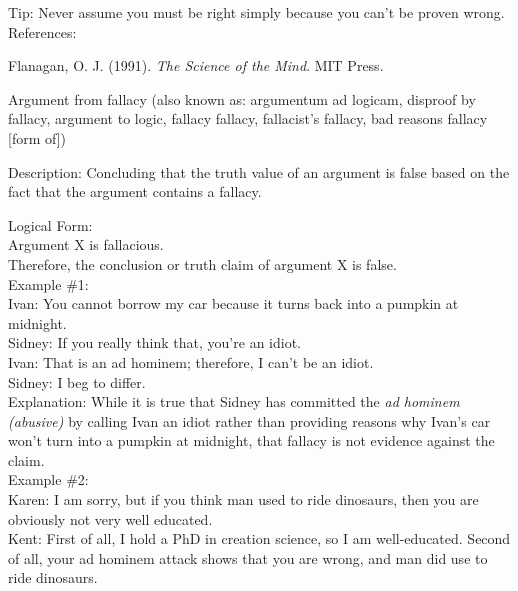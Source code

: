 \documentclass[a4paper,12pt,single,pdftex]{scrbook}
\begin{document}
      
        Tip: Never assume you must be right simply because you can’t be proven wrong.
      \\

      References:

      
        Flanagan, O. J. (1991). {\it The Science of the Mind}. MIT Press.
      
    
  

Argument from fallacy
    (also known as: argumentum ad logicam, disproof by fallacy, argument to logic, fallacy fallacy, fallacist's fallacy, bad reasons fallacy [form of])
  
    Description: Concluding that the truth value of an argument is false based on the fact that the argument contains a fallacy.

    
      Logical Form:
    \\

    
      Argument X is fallacious.
    \\

    
      Therefore, the conclusion or truth claim of argument X is false.
    \\

    
      Example \#1:
    \\

    
      Ivan: You cannot borrow my car because it turns back into a pumpkin at midnight.
    \\

    
      Sidney: If you really think that, you’re an idiot.
    \\

    
      Ivan: That is an ad hominem; therefore, I can’t be an idiot.
    \\

    
      Sidney: I beg to differ.
    \\

    
      Explanation: While it is true that Sidney has committed the {\it ad hominem (abusive)} by calling Ivan an idiot rather than providing reasons why Ivan’s car won’t turn into a pumpkin at midnight, that fallacy is not evidence against the claim.
    \\

    
      Example \#2:
    \\

    
      Karen: I am sorry, but if you think man used to ride dinosaurs, then you are obviously not very well educated.
    \\

    
      Kent:  First of all, I hold a PhD in creation science, so I am well-educated.  Second of all, your ad hominem attack shows that you are wrong, and man did use to ride dinosaurs.
    \\
\end{document}
